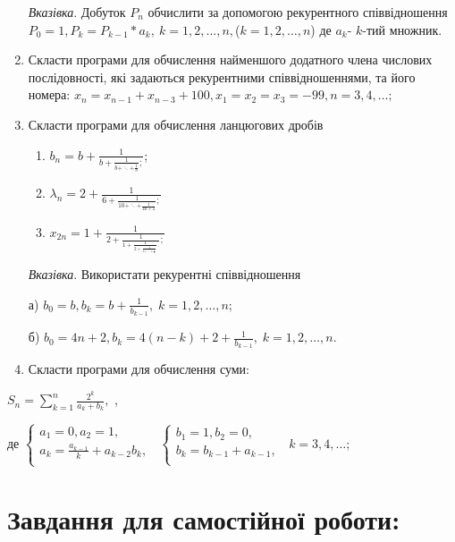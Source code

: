 \documentclass[a5paper,titlepage,openany,twoside,draft]{book_unv}%
\makeatletter
\newcommand{\xslalph}[1]{\expandafter\@xslalph\csname c@#1\endcsname}
\newcommand{\@xslalph}[1]{%
    \ifcase#1\or а\or б\or в\or г\or д\or e\or є\or ж\or з\or i%
    \or й\or к\or л\or м\or н\or о\or п\or р\or с\or т%
    \or у\or ф\or х\or ц\or ч\or ш\or ю\or я\or аа\or бб\or вв%
    \else\@ctrerr\fi%
}
\makeatother
\begin{document}
\begin{enumerate}
\emph{\emph{Вказівка}}. Добуток $P_{n}$ обчислити за
допомогою рекурентного співвідношення
\(P_{0} = 1,P_{k} = P_{k - 1}*a_{k},\ k = 1,2,\ldots,n,\)($k=1,2,\ldots,n$)
де \(a_{k}\)- $k$-тий множник.

\item
  Скласти програми для обчислення найменшого додатного члена числових
  послідовності, які задаються рекурентними співвідношеннями, та його
  номера:
\(x_{n} = x_{n - 1} + x_{n - 3} + 100, x_{1} = x_{2} = x_{3} = - 99, n = 3,4,\ldots;\)

\item
  Скласти програми для обчислення ланцюгових дробів
\begin{enumerate}[label=\xslalph*)]
\item \(b_{n} = b + \frac{1}{b + \frac{1}{b + \ddots + \frac{1}{b}};}\); 
\item
\(\lambda_{n} = 2 + \frac{1}{6 + \frac{1}{10 + \ddots + \frac{1}{4n + 2}};}\)
\item
\(x_{2n} = 1 + \frac{1}{2 + \frac{1}{1 + \frac{1}{2 + \frac{1}{1 + \ddots + \frac{1}{2}}}.};}\)
\end{enumerate}
\emph{\emph{Вказівка}}. Використати рекурентні співвідношення

а)
\(b_{0} = b,b_{k} = b + \frac{1}{b_{k - 1}}, \; k = 1,2,\ldots,n\);

б)
\(b_{0} = 4n + 2,b_{k} = 4(n - k) + 2 + \frac{1}{b_{k - 1}},\; k = 1,2,\ldots,n\).

\item
  Скласти програми для обчислення суми:
\end{enumerate}

\(S_{n} = \sum\limits_{k = 1}^{n}\frac{2^{k}}{a_{k} + b_{k}},\) ,

де \(\left\{ \begin{matrix}
 a_{1} = 0,a_{2} = 1, \\
 a_{k} = \frac{a_{k - 1}}{k} + a_{k - 2}b_{k}, \\
\end{matrix} \right.\ \) \(\left\{ \begin{matrix}
 b_{1} = 1,b_{2} = 0, \\
 b_{k} = b_{k - 1} + a_{k - 1}, \\
\end{matrix} \right.\ \) \(k = 3,4,\ldots;\)



\section{Завдання для самостійної роботи:}
\end{document}
